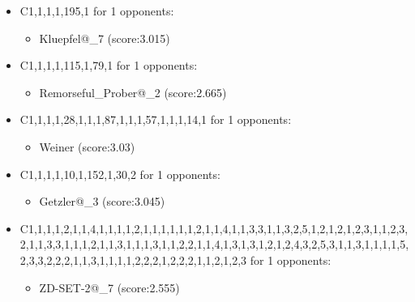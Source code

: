 \begin{appendices}
\begin{itemize}
        \item C1,1,1,1,195,1 for 1 opponents:
        \begin{multicols}{3}
            \begin{itemize}
                \item Kluepfel@\_7 (score:3.015)
            \end{itemize}
        \end{multicols}

        \item C1,1,1,1,115,1,79,1 for 1 opponents:
        \begin{multicols}{3}
            \begin{itemize}
                \item Remorseful\_Prober@\_2 (score:2.665)
            \end{itemize}
        \end{multicols}

        \item C1,1,1,1,28,1,1,1,87,1,1,1,57,1,1,1,14,1 for 1 opponents:
        \begin{multicols}{3}
            \begin{itemize}
                \item Weiner (score:3.03)
            \end{itemize}
        \end{multicols}

        \item C1,1,1,1,10,1,152,1,30,2 for 1 opponents:
        \begin{multicols}{3}
            \begin{itemize}
                \item Getzler@\_3 (score:3.045)
            \end{itemize}
        \end{multicols}

        \item C1,1,1,1,2,1,1,4,1,1,1,1,2,1,1,1,1,1,1,2,1,1,4,1,1,3,3,1,1,3,2,5,1,2,1,2,1,2,3,1,1,2,3,2,1,1,3,3,1,1,1,2,1,1,3,1,1,1,3,1,1,2,2,1,1,4,1,3,1,3,1,2,1,2,4,3,2,5,3,1,1,3,1,1,1,1,5,2,3,3,2,2,2,1,1,3,1,1,1,1,2,2,2,1,2,2,2,1,1,2,1,2,3 for 1 opponents:
        \begin{multicols}{3}
            \begin{itemize}
                \item ZD-SET-2@\_7 (score:2.555)
            \end{itemize}
        \end{multicols}


\end{itemize}
\end{appendices}
